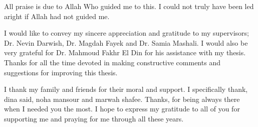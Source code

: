\documentclass[11pt,doublespace]{Sketchthesis}
\begin{document}

\begin{acknowledgments}     
All praise is due to Allah Who guided me to this. I could not truly have been led aright if Allah had not guided me.

I would like to convey my sincere appreciation and gratitude to my supervisors; Dr. Nevin Darwish, Dr. Magdah Fayek and Dr. Samia Mashali. I would also be very grateful for Dr. Mahmoud Fakhr El Din for his assistance with my thesis. Thanks for all the time devoted in making constructive comments and suggestions for improving this thesis.

 I thank my family and friends for their moral and support. I specifically thank, dina said, noha mansour and marwah shafee. Thanks, for being always there when I needed you the most. I hope to express my gratitude to all of you for supporting me and praying for me through all these years.
 \end{acknowledgments}                                   %


\tableofcontents                                        %
\listoffigures                                          %
\end{document}
